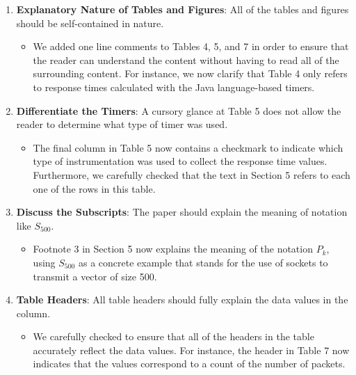 \documentclass[11pt]{article}
\begin{document}
\begin{enumerate}
\begin{itemize}
    \end{itemize}

  \item {\bf Explanatory Nature of Tables and Figures}: All of the
    tables and figures should be self-contained in nature.

    \begin{itemize}

      \item We added one line comments to Tables 4, 5, and 7 in order
        to ensure that the reader can understand the content without
        having to read all of the surrounding content.  For instance,
        we now clarify that Table 4 only refers to response times
        calculated with the Java language-based timers.

    \end{itemize}

  \item {\bf Differentiate the Timers}: A cursory glance at Table 5
    does not allow the reader to determine what type of timer was
    used.

    \begin{itemize}

      \item The final column in Table 5 now contains a checkmark to
        indicate which type of instrumentation was used to collect the
        response time values.  Furthermore, we carefully checked that
        the text in Section 5 refers to each one of the rows in this
        table.

    \end{itemize}

  \item {\bf Discuss the Subscripts}: The paper should explain the
    meaning of notation like $S_{500}$.

    \begin{itemize}

      \item Footnote 3 in Section 5 now explains the meaning of the
        notation $P_k$, using $S_{500}$ as a concrete example that
        stands for the use of sockets to transmit a vector of size
        500.

    \end{itemize}

  \item {\bf Table Headers}: All table headers should fully explain
    the data values in the column.

    \begin{itemize}

      \item We carefully checked to ensure that all of the headers in
        the table accurately reflect the data values.  For instance,
        the header in Table 7 now indicates that the values correspond
        to a count of the number of packets.

    \end{itemize}

\end{enumerate}
\end{document}

